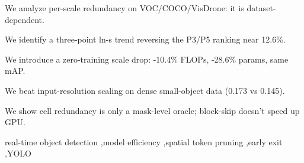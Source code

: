 \documentclass[a4paper,fleqn]{cas-dc}
\begin{document}
\begin{abstract}
Real-time detectors run at full capacity on every image, yet where their computation is redundant is rarely quantified. We study YOLO26n on three datasets spanning opposite object-size regimes (VOC, COCO, VisDrone) and report two findings. First, scale redundancy is dataset-dependent: removing the small-object scale P3 costs 0.010/0.032/0.101 mAP on VOC/COCO/VisDrone, whereas the large-object scale P5 costs 0.417/0.176/$\approx$0; per-scale gradient contributions track the small-object fraction, and P3 versus P5 importance reverses between 3.8\% and 24.8\% small objects (a three-point crossover near 12.6\%, not a law). Second, FLOPs $\neq$ FPS: head-level cell skipping yields no GPU speedup, and the $\sim$95\% cell redundancy is only exploitable as a mask-level oracle, not as real skipping on GPU. Where a scale is truly redundant, dropping it is a zero-training optimization: on VisDrone, P5 removal cuts FLOPs/parameters by 10.4\%/28.6\% at identical mAP and reduces single-image latency by 6\%. We also report negative results---early exit is infeasible and fine-tuning a dropped scale can hurt---as cautionary evidence for FLOPs-only efficiency claims.
\end{abstract}


\begin{highlights}
\item We analyze per-scale redundancy on VOC/COCO/VisDrone: it is dataset-dependent.
\item We identify a three-point ln-s trend reversing the P3/P5 ranking near 12.6\%.
\item We introduce a zero-training scale drop: -10.4\% FLOPs, -28.6\% params, same mAP.
\item We beat input-resolution scaling on dense small-object data (0.173 vs 0.145).
\item We show cell redundancy is only a mask-level oracle; block-skip doesn't speed up GPU.
\end{highlights}



\begin{keywords}
real-time object detection \sep model efficiency \sep spatial token pruning \sep early exit \sep YOLO
\end{keywords}
\end{document}
